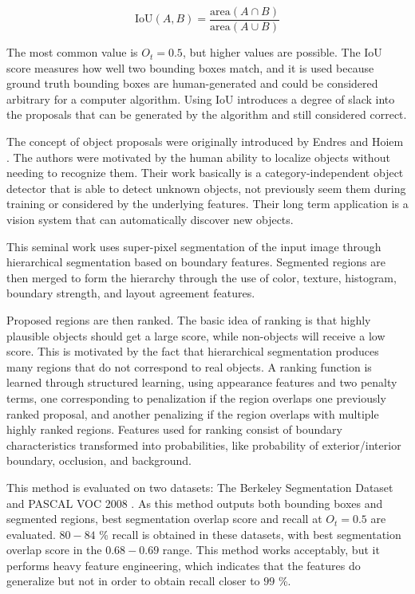 \begin{equation}
	\text{IoU}(A, B) = \frac{\text{area}(A \cap B)}{\text{area}(A \cup B)}
\end{equation}

The most common value \cite{everingham2010pascal} is $O_t = 0.5$, but higher values are possible. The IoU score measures how well two bounding boxes match, and it is used because ground truth bounding boxes are human-generated and could be considered arbitrary for a computer algorithm. Using IoU introduces a degree of slack into the proposals that can be generated by the algorithm and still considered correct.

The concept of object proposals were originally introduced by Endres and Hoiem \cite{endres2010category}. The authors were motivated by the human ability to localize objects without needing to recognize them. Their work basically is a category-independent object detector that is able to detect unknown objects, not previously seem them during training or considered by the underlying features. Their long term application is a vision system that can automatically discover new objects.

This seminal work uses super-pixel segmentation of the input image through hierarchical segmentation based on boundary features. Segmented regions are then merged to form the hierarchy through the use of color, texture, histogram, boundary strength, and layout agreement features.

Proposed regions are then ranked. The basic idea of ranking is that highly plausible objects should get a large score, while non-objects will receive a low score. This is motivated by the fact that hierarchical segmentation produces many regions that do not correspond to real objects. A ranking function is learned through structured learning, using appearance features and two penalty terms, one corresponding to penalization if the region overlaps one previously ranked proposal, and another penalizing if the region overlaps with multiple highly ranked regions. Features used for ranking consist of boundary characteristics transformed into probabilities, like probability of exterior/interior boundary, occlusion, and background.

This method is evaluated on two datasets: The Berkeley Segmentation Dataset and PASCAL VOC 2008 \cite[-2em]{everingham2010pascal}. As this method outputs both bounding boxes and segmented regions, best segmentation overlap score and recall at $O_t = 0.5$ are evaluated. $80-84$ \% recall is obtained in these datasets, with best segmentation overlap score in the $0.68-0.69$ range. This method works acceptably, but it performs heavy feature engineering, which indicates that the features do generalize but not in order to obtain recall closer to $99$ \%.

